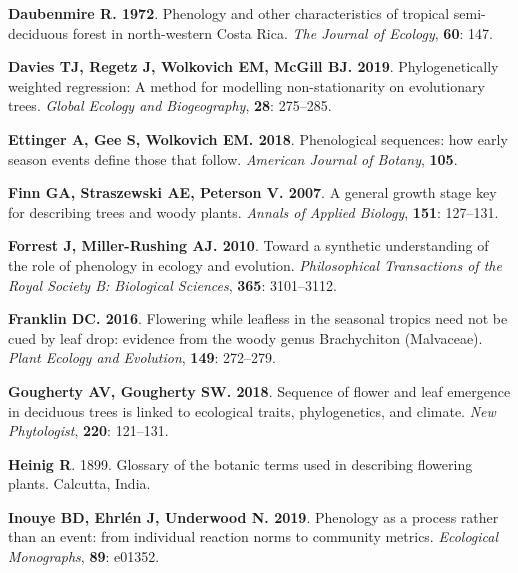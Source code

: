 \documentclass[11pt]{article}
\begin{document}
{\begin{thebibliography}{39}
{\bf Daubenmire R}{\bf . 1972}.
\newblock Phenology and other characteristics of tropical semi-deciduous forest
  in north-western Costa Rica.
\newblock \emph{The Journal of Ecology}, {\bf 60}: 147.

{\bf Davies TJ, Regetz J, Wolkovich EM, McGill BJ}{\bf . 2019}.
\newblock Phylogenetically weighted regression: A method for modelling
  non-stationarity on evolutionary trees.
\newblock \emph{Global Ecology and Biogeography}, {\bf 28}: 275--285.

{\bf Ettinger A, Gee S, Wolkovich EM}{\bf . 2018}.
\newblock Phenological sequences: how early season events define those that
  follow.
\newblock \emph{American Journal of Botany}, {\bf 105}.

{\bf Finn GA, Straszewski AE, Peterson V}{\bf . 2007}.
\newblock A general growth stage key for describing trees and woody plants.
\newblock \emph{Annals of Applied Biology}, {\bf 151}: 127--131.

{\bf Forrest J, Miller-Rushing AJ}{\bf . 2010}.
\newblock Toward a synthetic understanding of the role of phenology in ecology
  and evolution.
\newblock \emph{Philosophical Transactions of the Royal Society B: Biological
  Sciences}, {\bf 365}: 3101--3112.

{\bf Franklin DC}{\bf . 2016}.
\newblock Flowering while leafless in the seasonal tropics need not be cued by
  leaf drop: evidence from the woody genus Brachychiton (Malvaceae).
\newblock \emph{Plant Ecology and Evolution}, {\bf 149}: 272--279.

{\bf Gougherty AV, Gougherty SW}{\bf . 2018}.
\newblock Sequence of flower and leaf emergence in deciduous trees is linked to
  ecological traits, phylogenetics, and climate.
\newblock \emph{New Phytologist}, {\bf 220}: 121--131.

{\bf Heinig R}. 1899.
\newblock Glossary of the botanic terms used in describing flowering plants.
\newblock Calcutta, India.

{\bf Inouye BD, Ehrl{\'e}n J, Underwood N}{\bf . 2019}.
\newblock Phenology as a process rather than an event: from individual reaction
  norms to community metrics.
\newblock \emph{Ecological Monographs}, {\bf 89}: e01352.


\end{thebibliography}}
\end{document}
